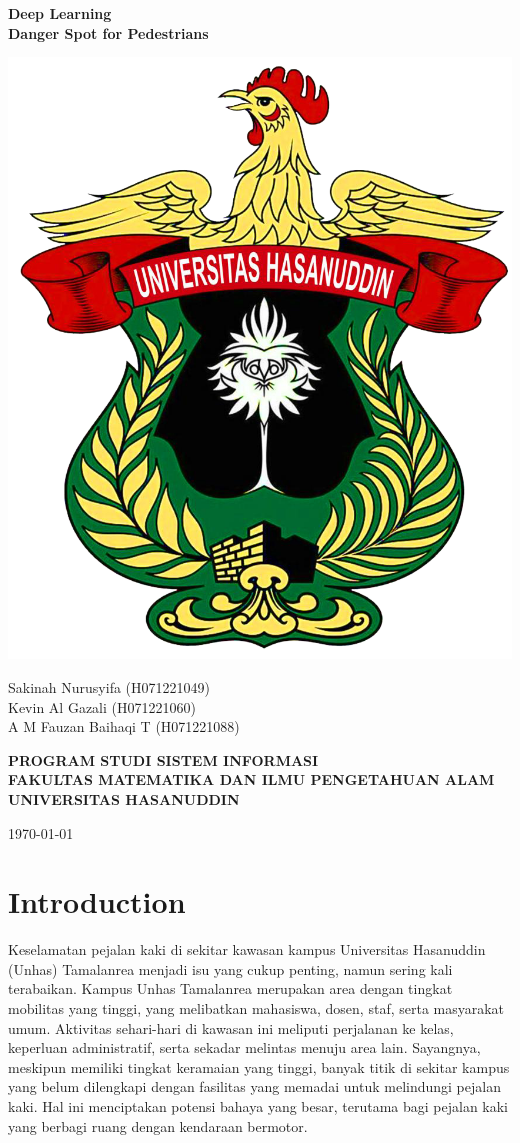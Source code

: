 \documentclass[12pt,a4paper]{article}
\begin{document}
\begin{titlepage}
    \centering
    {\Large\textbf{Deep Learning \\ Danger Spot for Pedestrians}\par} %
    \vspace{2cm} %
    \includegraphics[width=0.5\linewidth]{assets/Logo-Resmi-Unhas-1.png}\par %
    \vspace{2cm} %
    {\large
    Sakinah Nurusyifa (H071221049)\\ 
    Kevin Al Gazali (H071221060)\\ 
    A M Fauzan Baihaqi T (H071221088)\par}
    \vspace{1cm} %
    \textbf{PROGRAM STUDI SISTEM INFORMASI}\\
    \textbf{FAKULTAS MATEMATIKA DAN ILMU PENGETAHUAN ALAM}\\
    \textbf{UNIVERSITAS HASANUDDIN}\\[0.5cm]
    {\large\today\par} %
\end{titlepage}

\tableofcontents
\newpage

\section{Introduction}
Keselamatan pejalan kaki di sekitar kawasan kampus Universitas Hasanuddin (Unhas) Tamalanrea menjadi isu yang cukup penting, namun sering kali terabaikan. Kampus Unhas Tamalanrea merupakan area dengan tingkat mobilitas yang tinggi, yang melibatkan mahasiswa, dosen, staf, serta masyarakat umum. Aktivitas sehari-hari di kawasan ini meliputi perjalanan ke kelas, keperluan administratif, serta sekadar melintas menuju area lain. Sayangnya, meskipun memiliki tingkat keramaian yang tinggi, banyak titik di sekitar kampus yang belum dilengkapi dengan fasilitas yang memadai untuk melindungi pejalan kaki. Hal ini menciptakan potensi bahaya yang besar, terutama bagi pejalan kaki yang berbagi ruang dengan kendaraan bermotor.
\end{document}
